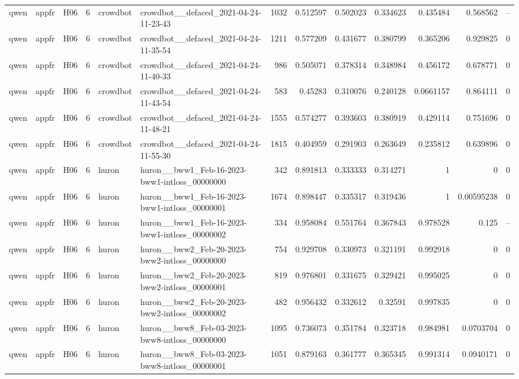 \begin{longtable}{lllrllrrrrrrr}
qwen & appfr & H06 & 6 & crowdbot & crowdbot\_\_defaced\_2021-04-24-11-23-43 & 1032 & 0.512597 & 0.502023 & 0.334623 & 0.435484 & 0.568562 & -- \\
qwen & appfr & H06 & 6 & crowdbot & crowdbot\_\_defaced\_2021-04-24-11-35-54 & 1211 & 0.577209 & 0.431677 & 0.380799 & 0.365206 & 0.929825 & 0 \\
qwen & appfr & H06 & 6 & crowdbot & crowdbot\_\_defaced\_2021-04-24-11-40-33 & 986 & 0.505071 & 0.378314 & 0.348984 & 0.456172 & 0.678771 & 0 \\
qwen & appfr & H06 & 6 & crowdbot & crowdbot\_\_defaced\_2021-04-24-11-43-54 & 583 & 0.45283 & 0.310076 & 0.240128 & 0.0661157 & 0.864111 & 0 \\
qwen & appfr & H06 & 6 & crowdbot & crowdbot\_\_defaced\_2021-04-24-11-48-21 & 1555 & 0.574277 & 0.393603 & 0.380919 & 0.429114 & 0.751696 & 0 \\
qwen & appfr & H06 & 6 & crowdbot & crowdbot\_\_defaced\_2021-04-24-11-55-30 & 1815 & 0.404959 & 0.291903 & 0.263649 & 0.235812 & 0.639896 & 0 \\
qwen & appfr & H06 & 6 & huron & huron\_\_bww1\_Feb-16-2023-bww1-intloss\_00000000 & 342 & 0.891813 & 0.333333 & 0.314271 & 1 & 0 & 0 \\
qwen & appfr & H06 & 6 & huron & huron\_\_bww1\_Feb-16-2023-bww1-intloss\_00000001 & 1674 & 0.898447 & 0.335317 & 0.319436 & 1 & 0.00595238 & 0 \\
qwen & appfr & H06 & 6 & huron & huron\_\_bww1\_Feb-16-2023-bww1-intloss\_00000002 & 334 & 0.958084 & 0.551764 & 0.367843 & 0.978528 & 0.125 & -- \\
qwen & appfr & H06 & 6 & huron & huron\_\_bww2\_Feb-20-2023-bww2-intloss\_00000000 & 754 & 0.929708 & 0.330973 & 0.321191 & 0.992918 & 0 & 0 \\
qwen & appfr & H06 & 6 & huron & huron\_\_bww2\_Feb-20-2023-bww2-intloss\_00000001 & 819 & 0.976801 & 0.331675 & 0.329421 & 0.995025 & 0 & 0 \\
qwen & appfr & H06 & 6 & huron & huron\_\_bww2\_Feb-20-2023-bww2-intloss\_00000002 & 482 & 0.956432 & 0.332612 & 0.32591 & 0.997835 & 0 & 0 \\
qwen & appfr & H06 & 6 & huron & huron\_\_bww8\_Feb-03-2023-bww8-intloss\_00000000 & 1095 & 0.736073 & 0.351784 & 0.323718 & 0.984981 & 0.0703704 & 0 \\
qwen & appfr & H06 & 6 & huron & huron\_\_bww8\_Feb-03-2023-bww8-intloss\_00000001 & 1051 & 0.879163 & 0.361777 & 0.365345 & 0.991314 & 0.0940171 & 0 \\

\end{longtable}
